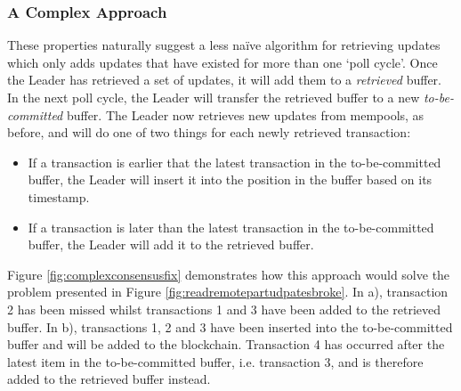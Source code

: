 \documentclass[12pt,a4paper,twoside,openright]{report}
\begin{document}
	\subsubsection*{A Complex Approach}
	These properties naturally suggest a less na{\"i}ve algorithm for retrieving updates which only adds updates that have existed for more than one `poll cycle'.
	Once the Leader has retrieved a set of updates, it will add them to a \textit{retrieved} buffer.
	In the next poll cycle, the Leader will transfer the retrieved buffer to a new \textit{to-be-committed} buffer.
	The Leader now retrieves new updates from mempools, as before, and will do one of two things for each newly retrieved transaction:
	\begin{itemize}
		\item If a transaction is earlier that the latest transaction in the to-be-committed buffer, the Leader will insert it into the position in the buffer based on its timestamp.
		\item If a transaction is later than the latest transaction in the to-be-committed buffer, the Leader will add it to the retrieved buffer.
	\end{itemize}
	Figure \ref{fig:complexconsensusfix} demonstrates how this approach would solve the problem presented in Figure \ref{fig:readremotepartudpatesbroke}.
	In a), transaction 2 has been missed whilst transactions 1 and 3 have been added to the retrieved buffer. 
	In b), transactions 1, 2 and 3 have been inserted into the to-be-committed buffer and will be added to the blockchain.
	Transaction 4 has occurred after the latest item in the to-be-committed buffer, i.e. transaction 3, and is therefore added to the retrieved buffer instead. \\
\end{document}
